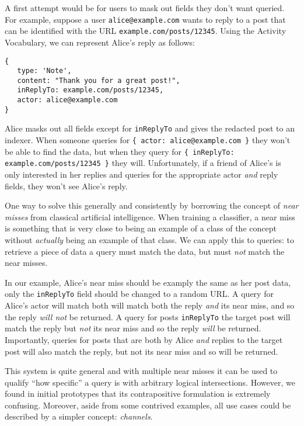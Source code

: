 A first attempt would be for users to mask out fields they don't want queried.
For example, suppose a user \texttt{alice@example.com} wants to reply to a post that can be identified with the URL \texttt{example.com/posts/12345}.
Using the Activity Vocabulary, we can represent Alice's reply as follows:

\begin{verbatim}
{
   type: 'Note',
   content: "Thank you for a great post!",
   inReplyTo: example.com/posts/12345,
   actor: alice@example.com
}
\end{verbatim}

Alice masks out all fields except for \texttt{inReplyTo} and gives the redacted post to an indexer.
When someone queries for \texttt{\{ actor: alice@example.com \}} they won't be able to find the data, but when they query for \texttt{\{ inReplyTo: example.com/posts/12345 \}} they will.
Unfortunately, if a friend of Alice's is only interested in her replies and queries for the appropriate actor \emph{and} reply fields, they won't see Alice's reply.

One way to solve this generally and consistently by borrowing the concept of \emph{near misses} from classical artificial intelligence.
When training a classifier, a near miss is something that is very close to being an example of a class of the concept without \emph{actually} being an example of that class.
We can apply this to queries: to retrieve a piece of data a query must match the data, but must \emph{not} match the near misses.

In our example, Alice's near miss should be examply the same as her post data, only
the \texttt{inReplyTo} field should be changed to a random URL.
A query for Alice's actor will match both will match both the reply \emph{and} its near miss, and so the reply \emph{will not} be returned.
A query for posts \texttt{inReplyTo} the target post will match the reply but \emph{not} its near miss and so the reply \emph{will} be returned.
Importantly, queries for posts that are both by Alice \emph{and} replies to the target post will also match the reply, but not its near miss and so will be returned.

This system is quite general and with multiple near misses it can be used to qualify ``how specific'' a query is with arbitrary logical intersections.
However, we found in initial prototypes that its contrapositive formulation is extremely confusing.
Moreover, aside from some contrived examples, all use cases could be described by a simpler concept: \emph{channels}.
